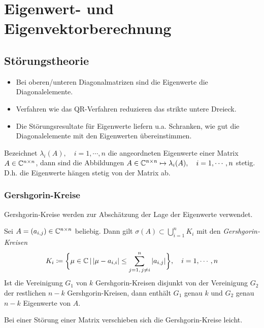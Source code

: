 \chapter{Eigenwert- und Eigenvektorberechnung}
    \section{Störungstheorie}
        \begin{itemize}
        	\item Bei oberen/unteren Diagonalmatrizen sind die Eigenwerte die Diagonalelemente.
        	\item Verfahren wie das QR-Verfahren reduzieren das strikte untere Dreieck.
        	\item Die Störungsresultate für Eigenwerte liefern u.a. Schranken, wie gut die Diagonalelemente mit den Eigenwerten übereinstimmen.
        \end{itemize}
    
        Bezeichnet \( \lambda_i(A), \quad i = 1, \cdots, n \) die angeordneten Eigenwerte einer Matrix \( A \in \mathbb{C}^{n \times n} \), dann sind die Abbildungen \( A \in \mathbb{C}^{n \times n} \mapsto \lambda_i(A), \quad i = 1, \cdots, n \) stetig. D.h. die Eigenwerte hängen stetig von der Matrix ab.

	    \subsection{Gershgorin-Kreise}
	        Gershgorin-Kreise werden zur Abschätzung der Lage der Eigenwerte verwendet.
	        
	        Sei \( A = (a_{i,j}) \in \mathbb{C}^{n \times n} \) beliebig. Dann gilt \( \sigma(A) \subset \bigcup_{i=1}^n K_i \) mit den \textit{Gershgorin-Kreisen}
	        \begin{equation*}
		        K_i \coloneqq \bigg\{ \mu \in \mathbb{C} \,\vert\, \abs{\mu - a_{i,i}} \leq \sum_{j = 1,\, j \neq i}^{n} \abs{a_{i,j}} \bigg\}, \quad i = 1, \cdots, n
	        \end{equation*}
	        Ist die Vereinigung \(G_1\) von \(k\) Gershgorin-Kreisen disjunkt von der Vereinigung \(G_2\) der restlichen \(n-k\) Gershgorin-Kreisen, dann enthält \(G_1\) genau \(k\) und \(G_2\) genau \(n-k\) Eigenwerte von \(A\).
	        
	        Bei einer Störung einer Matrix verschieben sich die Gershgorin-Kreise leicht.

